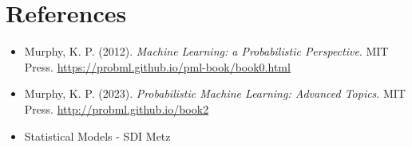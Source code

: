\documentclass[12pt, a4paper]{article}
\author{Baye Malick Gning}
\date{}
\title{}
\theoremstyle{definition}
\numberwithin{figure}{section}
\numberwithin{equation}{section}
\numberwithin{table}{section}
\begin{document}
\maketitle
\vspace{2cm}


\newpage
\tableofcontents
\newpage





% 

\newpage
\section{References}
\begin{itemize}
    \item Murphy, K. P. (2012). \textit{Machine Learning: a Probabilistic Perspective}. MIT Press. \url{https://probml.github.io/pml-book/book0.html}
    \item Murphy, K. P. (2023). \textit{Probabilistic Machine Learning: Advanced Topics}. MIT Press. \url{http://probml.github.io/book2}
    \item Statistical Models - SDI Metz
\end{itemize}
\end{document}
